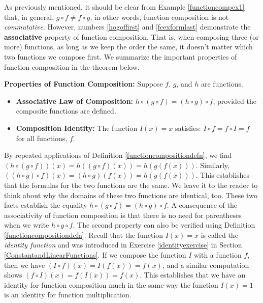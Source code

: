 \documentclass{ximera}
\begin{document}
As previously mentioned, it should be clear from  Example \ref{functioncompex1} that, in general, $g \circ f \neq f \circ g$, in other words, function composition is not \textit{commutative}.  However, numbers \ref{hogoffirst} and  \ref{fcexformlast} demonstrate the  \textbf{associative} property of function composition.  That is, when composing three (or more) functions, as long as we keep the order the same, it doesn't matter which two functions we compose first.  We summarize the important properties of function composition in the theorem below.

\medskip

\begin{theorem}\label{functioncompprops}  \textbf{Properties of Function Composition:} Suppose $f$, $g$, and $h$ are functions.  

\begin{itemize}

\item  \textbf{Associative Law of Composition:} $h \circ (g \circ f) = (h \circ g) \circ f$, provided the composite functions are defined.

\item  \textbf{Composition Identity:}  The function $I(x) = x$ satisfies:  $ I \circ f = f \circ I =f$ for all functions, $f$.

\end{itemize}

\end{theorem}

\medskip

By repeated applications of Definition \ref{functioncompositiondefn}, we find  $(h \circ (g \circ f))(x) = h((g \circ f)(x)) = h(g(f(x)))$.  Similarly, $((h \circ g) \circ f)(x) = (h \circ g)(f(x)) = h(g(f(x)))$.  This establishes that the formulas for the two functions are the same.  We leave it to the reader to think about why the domains of these two functions are identical, too.  These two facts establish the equality $h \circ (g \circ f) = (h \circ g) \circ f$.  A consequence of the associativity of function composition is that there is no need for parentheses when we write $h \circ g \circ f$. The second property can also be verified using Definition \ref{functioncompositiondefn}.  Recall that the function $I(x) = x$ is called the  \textit{identity function} and was introduced in Exercise  \ref{identityexercise} in Section \ref{ConstantandLinearFunctions}.  If we compose the function $I$ with a function $f$, then we have $(I \circ f)(x) = I(f(x)) = f(x)$, and a similar computation shows $(f\circ I)(x) = f(I(x)) = f(x)$. This establishes that we have an identity for function composition much in the same way the function $I(x) = 1$ is an identity for function multiplication. 
\end{document}

